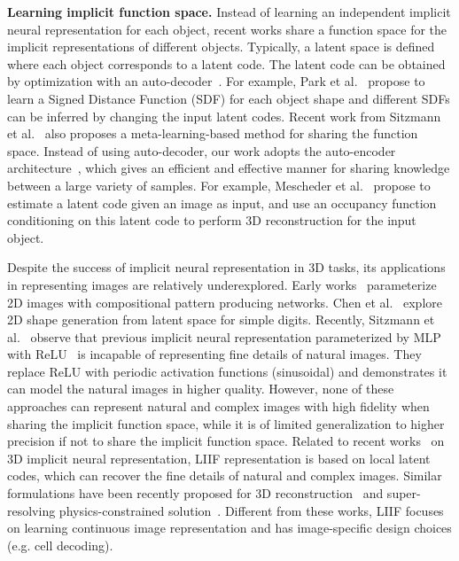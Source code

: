 \documentclass[final]{cvpr}
\begin{document}
\textbf{Learning implicit function space.} Instead of learning an independent implicit neural representation for each object, recent works share a function space for the implicit representations of different objects. Typically, a latent space is defined where each object corresponds to a latent code. The latent code can be obtained by optimization with an auto-decoder~\cite{park2019deepsdf,chen2019learning}. For example, Park et al.~\cite{park2019deepsdf} propose to learn a Signed Distance Function (SDF) for each object shape and different SDFs can be inferred by changing the input latent codes. Recent work from Sitzmann et al.~\cite{sitzmann2020metasdf} also proposes a meta-learning-based method for sharing the function space. Instead of using auto-decoder, our work adopts the auto-encoder architecture~\cite{mescheder2019occupancy,chen2019learning,saito2019pifu,saito2020pifuhd,xu2019disn}, which gives an efficient and effective manner for sharing knowledge between a large variety of samples. For example, Mescheder et al.~\cite{mescheder2019occupancy} propose to estimate a latent code given an image as input, and use an occupancy function conditioning on this latent code to perform 3D reconstruction for the input object.

Despite the success of implicit neural representation in 3D tasks, its applications in representing images are relatively underexplored. Early works~\cite{stanley2007compositional,mordvintsev2018differentiable} parameterize 2D images with compositional pattern producing networks. Chen et al.~\cite{chen2019learning} explore 2D shape generation from latent space for simple digits. Recently, Sitzmann et al.~\cite{sitzmann2020implicit} observe that previous implicit neural representation parameterized by MLP with ReLU~\cite{nair2010rectified} is incapable of representing fine details of natural images. They replace ReLU with periodic activation
functions (sinusoidal) and demonstrates it can model the natural images in higher quality. However, none of these approaches can represent natural and complex images with high fidelity when sharing the implicit function space, while it is of limited generalization to higher precision if not to share the implicit function space. Related to recent works~\cite{saito2019pifu,genova2020local,chibane2020implicit,peng2020eccv,jiang2020local} on 3D implicit neural representation, LIIF representation is based on local latent codes, which can recover the fine details of natural and complex images. Similar formulations have been recently proposed for 3D reconstruction~\cite{jiang2020local} and super-resolving physics-constrained solution~\cite{jiang2020meshfreeflownet}. Different from these works, LIIF focuses on learning continuous image representation and has image-specific design choices (e.g. cell decoding).
\end{document}
